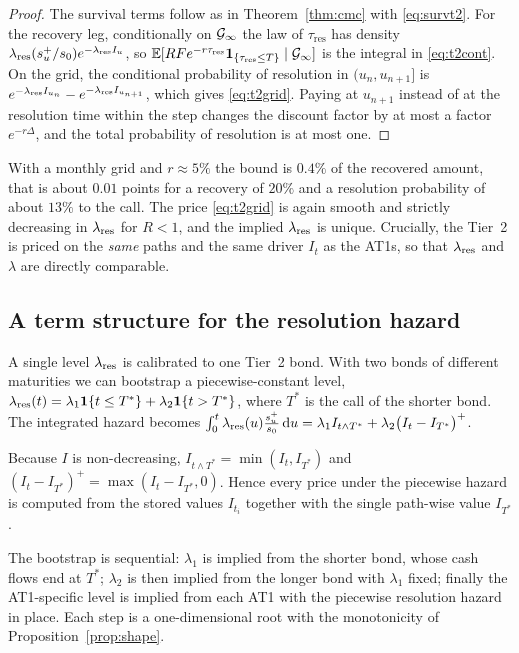\begin{proof}
The survival terms follow as in Theorem~\ref{thm:cmc} with \eqref{eq:survt2}. For the
recovery leg, conditionally on $\mathcal{G}_\infty$ the law of $\tau_{\mathrm{res}}$ has density
$\lambda_{\mathrm{res}}(s_u^+/s_0)e^{-\lambda_{\mathrm{res}} I_u}$, so
$\mathbb{E}[RFe^{-r\tau_{\mathrm{res}}}\mathbf{1}_{\{\tau_{\mathrm{res}}\le T\}}\mid\mathcal{G}_\infty]$ is the
integral in \eqref{eq:t2cont}. On the grid, the conditional probability of resolution in
$(u_n,u_{n+1}]$ is $e^{-\lambda_{\mathrm{res}} I_{u_n}}-e^{-\lambda_{\mathrm{res}} I_{u_{n+1}}}$, which gives
\eqref{eq:t2grid}. Paying at $u_{n+1}$ instead of at the resolution time within the step
changes the discount factor by at most a factor $e^{-r\Delta}$, and the total probability
of resolution is at most one.
\end{proof}

With a monthly grid and $r\approx5\%$ the bound is $0.4\%$ of the recovered amount, that
is about $0.01$ points for a recovery of $20\%$ and a resolution probability of about
$13\%$ to the call. The price \eqref{eq:t2grid} is again smooth and strictly
decreasing in $\lambda_{\mathrm{res}}$ for $R<1$, and the implied $\lambda_{\mathrm{res}}$ is unique. Crucially, the Tier~2
is priced on the \emph{same} paths and the same driver $I_t$ as the AT1s, so that $\lambda_{\mathrm{res}}$
and $\lambda$ are directly comparable.

\subsection{A term structure for the resolution hazard}\label{sec:piecewise}

A single level $\lambda_{\mathrm{res}}$ is calibrated to one Tier~2 bond. With two bonds of different
maturities we can bootstrap a piecewise-constant level,
$\lambda_{\mathrm{res}}(t)=\lambda_1\mathbf{1}\{t\le T^\ast\}+\lambda_2\mathbf{1}\{t>T^\ast\}$, where $T^\ast$ is the call of
the shorter bond. The integrated hazard becomes
$\int_0^t\lambda_{\mathrm{res}}(u)\frac{s_u^+}{s_0}\,\mathrm{d} u=\lambda_1I_{t\wedge T^\ast}+\lambda_2\bigl(I_t-I_{T^\ast}\bigr)^+$.

\begin{lemma}\label{lem:piecewise}
Because $I$ is non-decreasing, $I_{t\wedge T^\ast}=\min(I_t,I_{T^\ast})$ and
$(I_t-I_{T^\ast})^+=\max(I_t-I_{T^\ast},0)$. Hence every price under the piecewise hazard
is computed from the stored values $I_{t_i}$ together with the single path-wise value
$I_{T^\ast}$.
\end{lemma}

The bootstrap is sequential: $\lambda_1$ is implied from the shorter bond, whose cash
flows end at $T^\ast$; $\lambda_2$ is then implied from the longer bond with $\lambda_1$
fixed; finally the AT1-specific level is implied from each AT1 with the piecewise
resolution hazard in place. Each step is a one-dimensional root with the monotonicity of
Proposition~\ref{prop:shape}.

